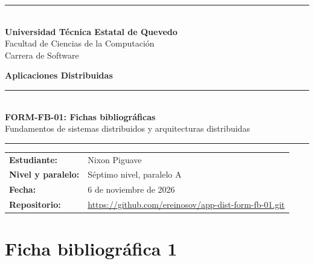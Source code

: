 \documentclass[12pt]{article}
\begin{document}
\begin{titlepage}
\thispagestyle{empty}

\vspace*{0.5cm}

\begin{center}

{\color{azuluteq}\rule{\textwidth}{1.2pt}}\\[0.8cm]

{\Large\bfseries Universidad Técnica Estatal de Quevedo}\\[0.3cm]
{\large Facultad de Ciencias de la Computación}\\
{\large Carrera de Software}

\vspace{2.2cm}

{\Large\bfseries Aplicaciones Distribuidas}

\vspace{1.8cm}

{\color{azuluteq}\rule{0.35\textwidth}{1.2pt}}\\[0.8cm]

{\LARGE\bfseries FORM-FB-01: Fichas bibliográficas}\\[0.45cm]
{\large Fundamentos de sistemas distribuidos y arquitecturas distribuidas}

\vspace{0.8cm}

{\color{azuluteq}\rule{0.35\textwidth}{1.2pt}}

\end{center}

\vfill

\noindent
\begin{tabular}{@{}p{}p{}@{}}
\textbf{Estudiante:} & Nixon Piguave\\[0.2cm]
\textbf{Nivel y paralelo:} & Séptimo nivel, paralelo A\\[0.2cm]
\textbf{Fecha:} & 6 de noviembre de 2026\\[0.2cm]
\textbf{Repositorio:} & \url{https://github.com/ereinosov/app-dist-form-fb-01.git}
\end{tabular}

\vspace*{0.7cm}

\end{titlepage}
\restoregeometry
\section*{Ficha bibliográfica 1}
\end{document}
